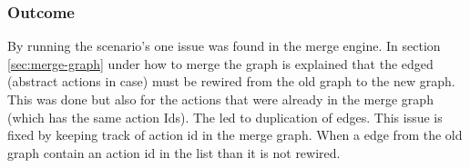 \subsubsection{Outcome}
By running the scenario's one issue was found in the merge engine. In section \ref{sec:merge-graph} under how to merge the graph is explained that the edged (abstract actions in \testar case) must be rewired from the old graph to the new graph. This was done but also for the actions that were already in the merge graph (which has the same action Ids). The led to duplication of edges. This issue is fixed by keeping track of action id in the merge graph. When a edge from the old graph contain an action id in the list than it is not rewired.
